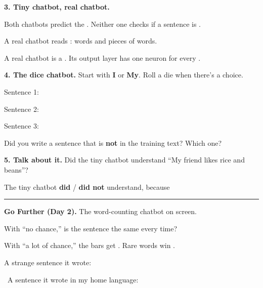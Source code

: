 \documentclass[11pt]{article}
\begin{document}
\vspace{0.9em}
{\large\textbf{3. Tiny chatbot, real chatbot.}}

\vspace{0.5em}
Both chatbots predict the . Neither one checks if a sentence is .

\vspace{0.9em}
A real chatbot reads : words and pieces of words.

\vspace{0.9em}
A real chatbot is a . Its output layer has one neuron for every .

\vspace{1.1em}
\newpage

{\large\textbf{4. The dice chatbot.}} Start with \textbf{I} or \textbf{My}. Roll a die when there's a choice.

\vspace{0.6em}
Sentence 1: 

\vspace{0.9em}
Sentence 2: \blank{5.6in}

\vspace{0.9em}
Sentence 3: \blank{5.6in}

\vspace{0.9em}
Did you write a sentence that is \textbf{not} in the training text? Which one? 

\vspace{1.1em}
{\large\textbf{5. Talk about it.}} Did the tiny chatbot understand ``My friend likes rice and beans''?

\vspace{0.6em}
The tiny chatbot \textbf{did} / \textbf{did not} understand, because 

\vspace{0.9em}
\blank{6.9in}

\vspace{1.0em}
\hrule
\vspace{0.6em}
{\large\textbf{Go Further (Day 2).}} The word-counting chatbot on screen.

\vspace{0.5em}
With ``no chance,'' is the sentence the same every time? 

\vspace{0.9em}
With ``a lot of chance,'' the bars get . Rare words win .

\vspace{0.9em}
A strange sentence it wrote: 

\vspace{0.9em}
\ELL\ A sentence it wrote in my home language: 

\vspace{1.1em}
\end{document}
